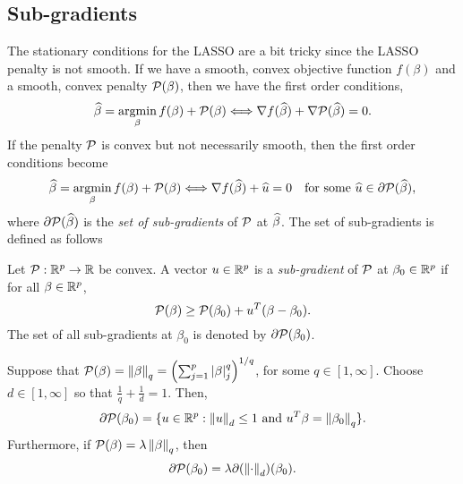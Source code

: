 \subsection{Sub-gradients}
The stationary conditions for the LASSO are a bit tricky since the LASSO penalty is not smooth. If we have a smooth, convex objective function $f(\beta)$ and a smooth, convex penalty ${\mathcal{P}}(\beta)$, then we have the first order conditions, 
\[\widehat{\beta}= \operatorname*{argmin}_\beta f(\beta)+{\mathcal{P}}(\beta) \Longleftrightarrow \nabla f(\widehat{\beta}) +\nabla {\mathcal{P}}(\widehat{\beta})= 0. \]
If the penalty ${\mathcal{P}}$ is convex but not necessarily smooth, then the first order conditions become
\[\widehat{\beta}= \operatorname*{argmin}_\beta f(\beta)+{\mathcal{P}}(\beta) \Longleftrightarrow \nabla f(\widehat{\beta}) +\widehat{u}= 0~~~\text{for some } \widehat{u} \in \partial {\mathcal{P}}(\widehat{\beta}),  \]
where $\partial {\mathcal{P}}(\widehat{\beta})$ is the \emph{set of sub-gradients} of ${\mathcal{P}}$ at $\widehat{\beta}$. The set of sub-gradients is defined as follows
\begin{definition}
    Let ${\mathcal{P}} : {\mathbb R}^p \to {\mathbb R}$ be convex. A vector $u \in {\mathbb R}^p$ is a \emph{sub-gradient} of ${\mathcal{P}}$ at $\beta_0 \in {\mathbb R}^p$ if for all $\beta \in {\mathbb R}^p$,
    \[{\mathcal{P}}(\beta) \ge {\mathcal{P}}(\beta_0)+u^T(\beta-\beta_0).\]
    The set of all sub-gradients at $\beta_0$ is denoted by $\partial {\mathcal{P}}(\beta_0)$.
\end{definition}
\begin{proposition}
    Suppose that ${\mathcal{P}}(\beta)=\left\|\beta\right\|_q = \left(
        \sum_{j=1}^p{\left\lvert\beta\right\rvert}_j^q\right)^{1/q}$, for some $q \in [1,\infty]$. Choose $d \in [1,\infty]$ so that $\frac{1}{q}+\frac{1}{d}=1$. Then,
        \[\partial {\mathcal{P}}(\beta_0) = \{u \in {\mathbb R}^p : \left\|u\right\|_d \le 1 \text{ and } u^T\beta = \left\|\beta_0\right\|_q\}. \]
        Furthermore, if ${\mathcal{P}}(\beta) = \lambda\left\|\beta\right\|_q$, then 
        \[\partial {\mathcal{P}}(\beta_0) = \lambda \partial( \left\|\cdot\right\|_d)(\beta_0). \]
\end{proposition}
